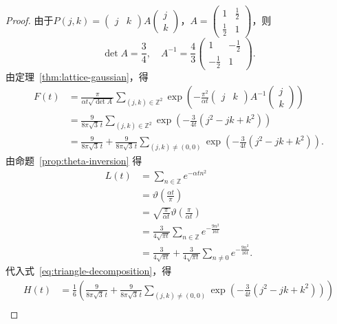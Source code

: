 \documentclass[UTF8,zihao=5,linespread=1.34]{ctexart}
\theoremstyle{cnplain}
\theoremstyle{cnremark}
\begin{document}
\begin{proof}
由于$P(j,k) = \begin{pmatrix} j & k \end{pmatrix} A \begin{pmatrix} j \\ k \end{pmatrix}$，$A = \begin{pmatrix} 1 & \frac{1}{2} \\ \frac{1}{2} & 1 \end{pmatrix}$，则
\[
\det A = \frac{3}{4},\quad A^{-1} = \frac{4}{3} \begin{pmatrix} 1 & -\frac{1}{2} \\ -\frac{1}{2} & 1 \end{pmatrix}.
\]
由定理~\ref{thm:lattice-gaussian}，得
\begin{align*}
F(t) &= \frac{\pi}{\alpha t \sqrt{\det A}}
       \sum_{(j,k) \in \mathbb{Z}^{2}} \exp\left(-\frac{\pi^{2}}{\alpha t} \begin{pmatrix} j & k \end{pmatrix} A^{-1} \begin{pmatrix} j \\ k \end{pmatrix}\right) \\
&= \frac{9}{8\pi\sqrt{3}\, t}
   \sum_{(j,k) \in \mathbb{Z}^{2}} \exp\left(-\frac{3}{4t} (j^{2} - jk + k^{2})\right) \\
&= \frac{9}{8\pi\sqrt{3}\, t}
   + \frac{9}{8\pi\sqrt{3}\, t}
   \sum_{(j,k) \neq (0,0)} \exp\left(-\frac{3}{4t} (j^{2} - jk + k^{2})\right).
\end{align*}
由命题~\ref{prop:theta-inversion} 得
\begin{align*}
L(t)
&= \sum_{n \in \mathbb{Z}} e^{-\alpha t n^{2}} \\
&= \vartheta\left(\frac{\alpha t}{\pi}\right) \\
&= \sqrt{\frac{\pi}{\alpha t}} \vartheta\left(\frac{\pi}{\alpha t}\right) \\
&= \frac{3}{4\sqrt{\pi t}} \sum_{n \in \mathbb{Z}} e^{-\frac{9n^{2}}{16t}} \\
&= \frac{3}{4\sqrt{\pi t}}
   + \frac{3}{4\sqrt{\pi t}} \sum_{n \neq 0} e^{-\frac{9n^{2}}{16t}}.
\end{align*}
代入式~\eqref{eq:triangle-decomposition}，得
\begin{align*}
H(t) &= \frac{1}{6}\left(\frac{9}{8\pi\sqrt{3}\, t}
      + \frac{9}{8\pi\sqrt{3}\, t}
      \sum_{(j,k) \neq (0,0)} \exp\left(-\frac{3}{4t} (j^{2} - jk + k^{2})\right)\right) \\

\end{align*}
\end{proof}
\end{document}
